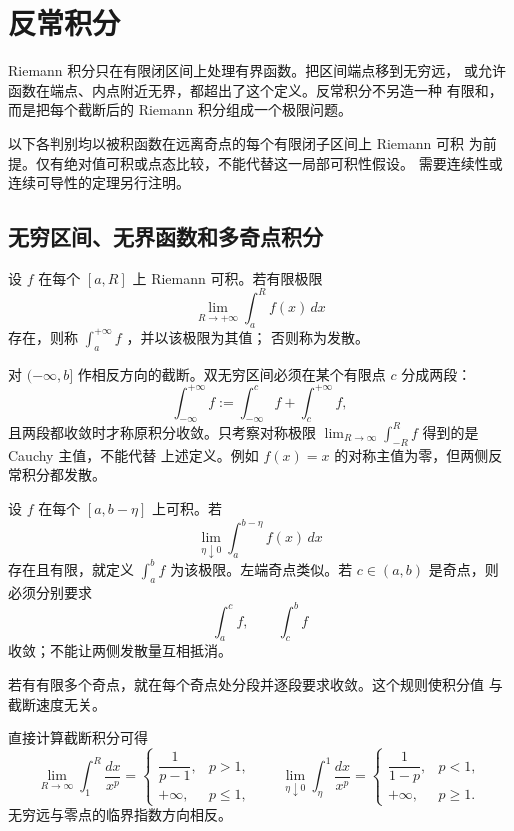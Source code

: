 \chapter{反常积分}
\label{chap:improper-integrals}

Riemann 积分只在有限闭区间上处理有界函数。把区间端点移到无穷远，
或允许函数在端点、内点附近无界，都超出了这个定义。反常积分不另造一种
有限和，而是把每个截断后的 Riemann 积分组成一个极限问题。

以下各判别均以被积函数在远离奇点的每个有限闭子区间上 Riemann 可积
为前提。仅有绝对值可积或点态比较，不能代替这一局部可积性假设。
需要连续性或连续可导性的定理另行注明。

\section{无穷区间、无界函数和多奇点积分}

\begin{definition}[无穷区间上的积分]
设 \(f\) 在每个 \([a,R]\) 上 Riemann 可积。若有限极限
\[
 \lim_{R\to+\infty}\int_a^R f(x)\,dx
\]
存在，则称 \(\int_a^{+\infty}f\) ，并以该极限为其值；
否则称为发散。
\end{definition}

对 \((-\infty,b]\) 作相反方向的截断。双无穷区间必须在某个有限点
\(c\) 分成两段：
\[
 \int_{-\infty}^{+\infty}f
 :=
 \int_{-\infty}^c f+\int_c^{+\infty}f,
\]
且两段都收敛时才称原积分收敛。只考察对称极限
\(\lim_{R\to\infty}\int_{-R}^R f\) 得到的是 Cauchy 主值，不能代替
上述定义。例如 \(f(x)=x\) 的对称主值为零，但两侧反常积分都发散。

\begin{definition}[无界点附近的积分]
设 \(f\) 在每个 \([a,b-\eta]\) 上可积。若
\[
 \lim_{\eta\downarrow0}\int_a^{b-\eta}f(x)\,dx
\]
存在且有限，就定义 \(\int_a^b f\) 为该极限。左端奇点类似。若
\(c\in(a,b)\) 是奇点，则必须分别要求
\[
 \int_a^c f,\qquad \int_c^b f
\]
收敛；不能让两侧发散量互相抵消。
\end{definition}

若有有限多个奇点，就在每个奇点处分段并逐段要求收敛。这个规则使积分值
与截断速度无关。

\begin{example}[\(p\)-型积分]
\label{ex:p-improper-integrals}
直接计算截断积分可得
\[
 \lim_{R\to\infty}\int_1^R \frac{dx}{x^p}
 =
 \begin{cases}
 \dfrac{1}{p-1},&p>1,\\
 +\infty,&p\le1,
 \end{cases}
\qquad
 \lim_{\eta\downarrow0}\int_\eta^1 \frac{dx}{x^p}
 =
 \begin{cases}
 \dfrac{1}{1-p},&p<1,\\
 +\infty,&p\ge1.
 \end{cases}
\]
无穷远与零点的临界指数方向相反。
\end{example}

